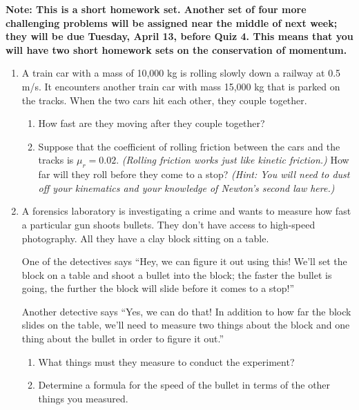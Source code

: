 \documentclass[12pt]{article}
\begin{document}
\Large
\centerline{}
\normalsize
\centerline{}

{\bf Note: This is a short homework set. Another set of four more challenging problems will be assigned near the middle of next week; they will be due Tuesday, April 13, before Quiz 4. This means that you will have two short homework sets on the conservation of momentum.}

\begin{enumerate}

\item {A train car with a mass of 10,000 kg is rolling slowly down a railway at 0.5 m/s. It encounters another train car with mass 15,000 kg that is parked on the tracks. When the two cars hit each other, they couple together.
	
\begin{enumerate}
	\item How fast are they moving after they couple together?
	\item Suppose that the coefficient of rolling friction between the cars and the tracks is $\mu_r=0.02$. {\it (Rolling friction works just like kinetic friction.)} How far will they roll before they come to a stop? {\it (Hint: You will need to dust off your kinematics and your knowledge of Newton's second law here.)}
\end{enumerate}
}

\item A forensics laboratory is investigating a crime and wants to measure how fast a particular gun shoots bullets. They don't have access to high-speed photography. All they have a clay block sitting on a table.

One of the detectives says ``Hey, we can figure it out using this! We'll set the block on a table and shoot a bullet into the block; the faster the bullet is going, the further the block will slide before it comes to a stop!''

Another detective says ``Yes, we can do that! In addition to how far the block slides on the table, we'll need to measure two things about the block and one thing about the bullet in order to figure it out.''

\begin{enumerate}
	\item What things must they measure to conduct the experiment?
	\item Determine a formula for the speed of the bullet in terms of the other things you measured.
\end{enumerate}


\end{enumerate}
\end{document}
